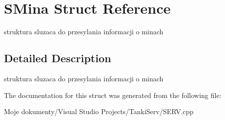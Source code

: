 \section{SMina Struct Reference}
\label{struct_s_mina}
struktura sluzaca do przesylania informacji o minach  




\subsection{Detailed Description}
struktura sluzaca do przesylania informacji o minach 



The documentation for this struct was generated from the following file:\begin{CompactItemize}
\item 
Moje dokumenty/Visual Studio Projects/TankiServ/SERV.cpp\end{CompactItemize}
